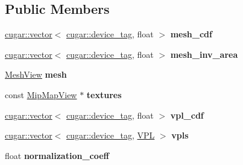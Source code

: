 \subsection*{Public Members}
\begin{DoxyCompactItemize}
\item 
\mbox{\label{struct_mesh_lights_storage_impl_a9886b7fb2d67bb05efbaaccfe605b956}} 
\hyperlink{structcugar_1_1vector}{cugar\+::vector}$<$ \hyperlink{structcugar_1_1device__tag}{cugar\+::device\+\_\+tag}, float $>$ {\bfseries mesh\+\_\+cdf}
\item 
\mbox{\label{struct_mesh_lights_storage_impl_a7c38f42a8a611a5aa55287b6f7f55646}} 
\hyperlink{structcugar_1_1vector}{cugar\+::vector}$<$ \hyperlink{structcugar_1_1device__tag}{cugar\+::device\+\_\+tag}, float $>$ {\bfseries mesh\+\_\+inv\+\_\+area}
\item 
\mbox{\label{struct_mesh_lights_storage_impl_ac588a41139d940bb099eab4fd713a268}} 
\hyperlink{struct_mesh_view}{Mesh\+View} {\bfseries mesh}
\item 
\mbox{\label{struct_mesh_lights_storage_impl_ab0caf763cc492a5dfca57abab0fcaff2}} 
const \hyperlink{struct_mip_map_view}{Mip\+Map\+View} $\ast$ {\bfseries textures}
\item 
\mbox{\label{struct_mesh_lights_storage_impl_abed6ef825bcd530e693421b0e04fd0dc}} 
\hyperlink{structcugar_1_1vector}{cugar\+::vector}$<$ \hyperlink{structcugar_1_1device__tag}{cugar\+::device\+\_\+tag}, float $>$ {\bfseries vpl\+\_\+cdf}
\item 
\mbox{\label{struct_mesh_lights_storage_impl_a80505b91f5c2bbcfe747bd6b6d1aef7b}} 
\hyperlink{structcugar_1_1vector}{cugar\+::vector}$<$ \hyperlink{structcugar_1_1device__tag}{cugar\+::device\+\_\+tag}, \hyperlink{struct_v_p_l}{V\+PL} $>$ {\bfseries vpls}
\item 
\mbox{\label{struct_mesh_lights_storage_impl_a19c1d1a7c54a10418758283f7f020ff8}} 
float {\bfseries normalization\+\_\+coeff}
\item 
\mbox{\label{struct_mesh_lights_storage_impl_a8c4db066f10c37ea2cbee33392f87919}} 

\end{DoxyCompactItemize}
